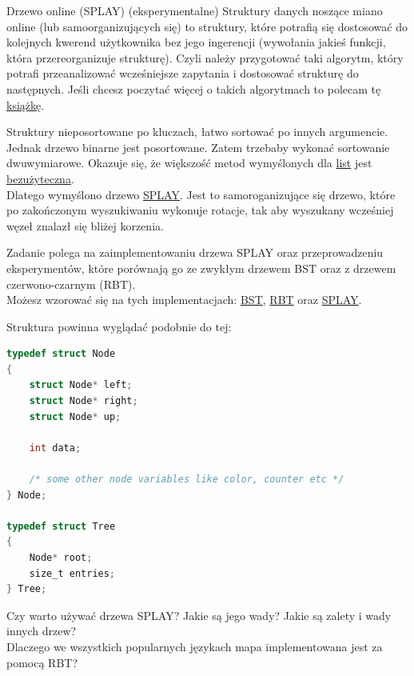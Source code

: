 \clearpage

\begin{exercise}{Drzewo online (SPLAY) (eksperymentalne)}{}
Struktury danych noszące miano online (lub samoorganizujących się) to struktury, które potrafią się dostosować do kolejnych kwerend użytkownika bez jego ingerencji (wywołania jakieś funkcji, która przereorganizuje strukturę). Czyli należy przygotować taki algorytm, który potrafi przeanalizować wcześniejsze zapytania i dostosować strukturę do następnych. Jeśli chcesz poczytać więcej o takich algorytmach to polecam tę \href{https://link.springer.com/chapter/10.1007/BFb0029563}{książkę}.

Struktury nieposortowane po kluczach, łatwo sortować po innych argumencie. Jednak drzewo binarne jest posortowane. Zatem trzebaby wykonać sortowanie dwuwymiarowe. Okazuje się, że większość metod wymyślonych dla \href{https://en.wikipedia.org/wiki/Self-organizing_list}{list} jest \href{https://ieeexplore.ieee.org/document/4567900}{bezużyteczna}. \\

Dlatego wymyślono drzewo \href{https://en.wikipedia.org/wiki/Splay_tree}{SPLAY}. Jest to samoroganizujące się drzewo, które po zakończonym wyszukiwaniu wykonuje rotacje, tak aby wyszukany wcześniej węzeł znalazł się bliżej korzenia.

Zadanie polega na zaimplementowaniu drzewa SPLAY oraz przeprowadzeniu eksperymentów, które porównają go ze zwykłym drzewem BST oraz z drzewem czerwono-czarnym (RBT). \\
Możesz wzorować się na tych implementacjach: \href{https://www.geeksforgeeks.org/binary-search-tree-set-1-search-and-insertion/}{BST},
\href{https://www.geeksforgeeks.org/red-black-tree-set-1-introduction-2/}{RBT} oraz
\href{https://www.geeksforgeeks.org/splay-tree-set-1-insert/}{SPLAY}.

Struktura powinna wyglądać podobnie do tej:
\begin{lstlisting}[language=C,style=C99]
typedef struct Node
{
    struct Node* left;
    struct Node* right;
    struct Node* up;
    
    int data;
    
    /* some other node variables like color, counter etc */
} Node;

typedef struct Tree
{
    Node* root;
    size_t entries;
} Tree;


\end{lstlisting}

Czy warto używać drzewa SPLAY? Jakie są jego wady? Jakie są zalety i wady innych drzew?\\
Dlaczego we wszystkich popularnych językach mapa implementowana jest za pomocą RBT?
\end{exercise}

